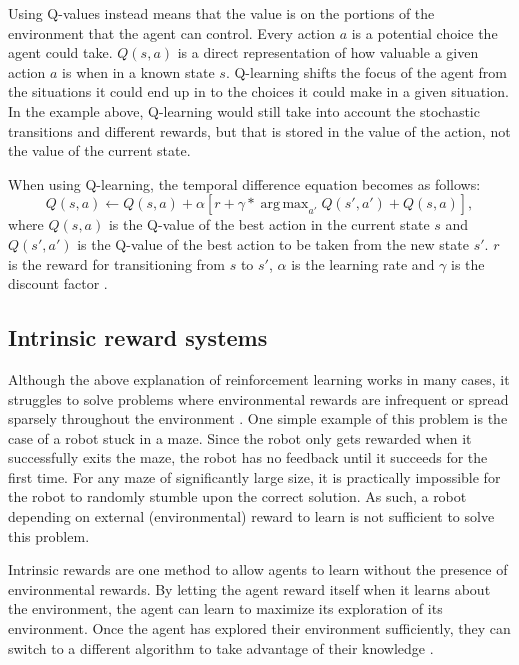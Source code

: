 \documentclass[12pt]{thesis}
\DeclareMathOperator*{\argmax}{arg\,max}
\begin{document}
Using Q-values instead means that the value is on the portions of the environment that the agent can control. Every action $a$ is a potential choice the agent could take. $Q(s,a)$ is a direct representation of how valuable a given action $a$ is when in a known state $s$. Q-learning shifts the focus of the agent from the situations it could end up in to the choices it could make in a given situation. In the example above, Q-learning would still take into account the stochastic transitions and different rewards, but that is stored in the value of the action, not the value of the current state.

When using Q-learning, the temporal difference equation becomes as follows:
\begin{equation}
	Q(s,a) \leftarrow Q(s,a) + \alpha \left[r + \gamma *  \argmax_{a'} Q(s',a') + Q(s,a)\right],
	\label{eq:TDQVF}
\end{equation}
where $Q(s,a)$ is the Q-value of the best action in the current state $s$ and $Q(s',a')$ is the Q-value of the best action to be taken from the new state $s'$. $r$ is the reward for transitioning from $s$ to $s'$, $\alpha$ is the learning rate and $\gamma$ is the discount factor \cite{Ladosz_2022}.

\subsection{Intrinsic reward systems}
Although the above explanation of reinforcement learning works in many cases, it struggles to solve problems where environmental rewards are infrequent or spread sparsely throughout the environment \cite{DBLP:journals/corr/abs-1908-06976}
\cite{FToCFaIM:Jurgen}.
One simple example of this problem is the case of a robot stuck in a maze. Since the robot only gets rewarded when it successfully exits the maze, the robot has no feedback until it succeeds for the first time. For any maze of significantly large size, it is practically impossible for the robot to randomly stumble upon the correct solution. As such, a robot depending on external (environmental) reward to learn is not sufficient to solve this problem.

Intrinsic rewards are one method to allow agents to learn without the presence of environmental rewards. By letting the agent reward itself when it learns about the environment, the agent can learn to maximize its exploration of its environment. Once the agent has explored their environment sufficiently, they can switch to a different algorithm to take advantage of their knowledge \cite{Rein:VIME}.
\end{document}
